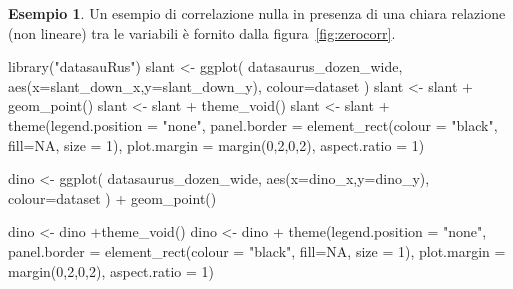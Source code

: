 \documentclass[
  11pt,
  italian,
  a4paper,
  extrafontsizes,onecolumn,openright
  ]{memoir}
\newenvironment{Shaded}{\begin{snugshade}}{\end{snugshade}}
\newcommand{\AttributeTok}[1]{\textcolor[rgb]{0.77,0.63,0.00}{#1}}
\newcommand{\ConstantTok}[1]{\textcolor[rgb]{0.00,0.00,0.00}{#1}}
\newcommand{\DecValTok}[1]{\textcolor[rgb]{0.00,0.00,0.81}{#1}}
\newcommand{\FunctionTok}[1]{\textcolor[rgb]{0.00,0.00,0.00}{#1}}
\newcommand{\NormalTok}[1]{#1}
\newcommand{\OtherTok}[1]{\textcolor[rgb]{0.56,0.35,0.01}{#1}}
\newcommand{\SpecialCharTok}[1]{\textcolor[rgb]{0.00,0.00,0.00}{#1}}
\newcommand{\StringTok}[1]{\textcolor[rgb]{0.31,0.60,0.02}{#1}}
\theoremstyle{definition}
\theoremstyle{definition}
\newtheorem{example}{Esempio}[chapter]
\theoremstyle{definition}
\theoremstyle{definition}
\theoremstyle{remark}
\begin{document}
\begin{example}

Un esempio di correlazione nulla in presenza di una chiara relazione (non lineare) tra le variabili è fornito dalla figura~\ref{fig:zerocorr}.

\begin{Shaded}
\begin{Highlighting}[]
\FunctionTok{library}\NormalTok{(}\StringTok{"datasauRus"}\NormalTok{)}
\NormalTok{slant }\OtherTok{\textless{}{-}} \FunctionTok{ggplot}\NormalTok{(}
\NormalTok{  datasaurus\_dozen\_wide, }
  \FunctionTok{aes}\NormalTok{(}\AttributeTok{x=}\NormalTok{slant\_down\_x,}\AttributeTok{y=}\NormalTok{slant\_down\_y),   }
  \AttributeTok{colour=}\NormalTok{dataset}
\NormalTok{) }
\NormalTok{slant }\OtherTok{\textless{}{-}}\NormalTok{ slant }\SpecialCharTok{+} 
  \FunctionTok{geom\_point}\NormalTok{() }
\NormalTok{slant }\OtherTok{\textless{}{-}}\NormalTok{ slant }\SpecialCharTok{+} 
  \FunctionTok{theme\_void}\NormalTok{() }
\NormalTok{slant }\OtherTok{\textless{}{-}}\NormalTok{ slant }\SpecialCharTok{+} 
  \FunctionTok{theme}\NormalTok{(}\AttributeTok{legend.position =} \StringTok{"none"}\NormalTok{, }
        \AttributeTok{panel.border =} \FunctionTok{element\_rect}\NormalTok{(}\AttributeTok{colour =} \StringTok{"black"}\NormalTok{, }\AttributeTok{fill=}\ConstantTok{NA}\NormalTok{, }\AttributeTok{size =} \DecValTok{1}\NormalTok{),}
        \AttributeTok{plot.margin =} \FunctionTok{margin}\NormalTok{(}\DecValTok{0}\NormalTok{,}\DecValTok{2}\NormalTok{,}\DecValTok{0}\NormalTok{,}\DecValTok{2}\NormalTok{), }\AttributeTok{aspect.ratio =} \DecValTok{1}\NormalTok{) }

\NormalTok{dino }\OtherTok{\textless{}{-}} \FunctionTok{ggplot}\NormalTok{(}
\NormalTok{  datasaurus\_dozen\_wide, }
  \FunctionTok{aes}\NormalTok{(}\AttributeTok{x=}\NormalTok{dino\_x,}\AttributeTok{y=}\NormalTok{dino\_y), }
  \AttributeTok{colour=}\NormalTok{dataset}
\NormalTok{  ) }\SpecialCharTok{+}
  \FunctionTok{geom\_point}\NormalTok{() }

\NormalTok{dino }\OtherTok{\textless{}{-}}\NormalTok{ dino }\SpecialCharTok{+}\FunctionTok{theme\_void}\NormalTok{() }
\NormalTok{dino }\OtherTok{\textless{}{-}}\NormalTok{ dino }\SpecialCharTok{+} 
  \FunctionTok{theme}\NormalTok{(}\AttributeTok{legend.position =} \StringTok{"none"}\NormalTok{, }
        \AttributeTok{panel.border =}  \FunctionTok{element\_rect}\NormalTok{(}\AttributeTok{colour =} \StringTok{"black"}\NormalTok{, }\AttributeTok{fill=}\ConstantTok{NA}\NormalTok{, }\AttributeTok{size =} \DecValTok{1}\NormalTok{),}
        \AttributeTok{plot.margin =} \FunctionTok{margin}\NormalTok{(}\DecValTok{0}\NormalTok{,}\DecValTok{2}\NormalTok{,}\DecValTok{0}\NormalTok{,}\DecValTok{2}\NormalTok{), }\AttributeTok{aspect.ratio =} \DecValTok{1}\NormalTok{) }


\end{Highlighting}
\end{Shaded}
\end{example}
\end{document}
